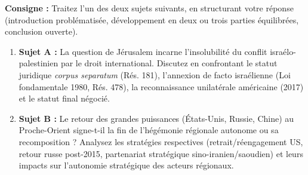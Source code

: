 \documentclass[11pt]{article}
\begin{document}
\begin{exercice}
\textbf{Consigne :} Traitez l'un des deux sujets suivants, en structurant votre réponse (introduction problématisée, développement en deux ou trois parties équilibrées, conclusion ouverte).

\begin{enumerate}
    \item \textbf{Sujet A :} \og La question de Jérusalem incarne l'insolubilité du conflit israélo-palestinien par le droit international. \fg{} Discutez en confrontant le statut juridique \textit{corpus separatum} (Rés. 181), l'annexion de facto israélienne (Loi fondamentale 1980, Rés. 478), la reconnaissance unilatérale américaine (2017) et le statut final négocié.
    \item \textbf{Sujet B :} \og Le retour des grandes puissances (États-Unis, Russie, Chine) au Proche-Orient signe-t-il la fin de l'hégémonie régionale autonome ou sa recomposition ? \fg{} Analysez les stratégies respectives (retrait/réengagement US, retour russe post-2015, partenariat stratégique sino-iranien/saoudien) et leurs impacts sur l'autonomie stratégique des acteurs régionaux.
\end{enumerate}
\end{exercice}
\end{document}
